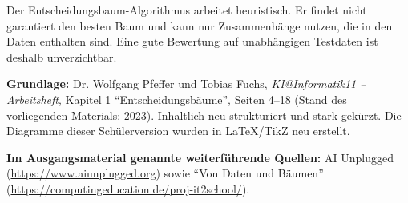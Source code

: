 \documentclass[11pt,a4paper,twoside]{article}
\begin{document}
\begin{merke}[title=Grenzen des Verfahrens]
Der Entscheidungsbaum-Algorithmus arbeitet heuristisch. Er findet nicht garantiert den besten Baum und kann
nur Zusammenhänge nutzen, die in den Daten enthalten sind. Eine gute Bewertung auf unabhängigen Testdaten
ist deshalb unverzichtbar.
\end{merke}

\vfill
{\footnotesize\color{midgray}
\textbf{Grundlage:} Dr. Wolfgang Pfeffer und Tobias Fuchs, \emph{KI@Informatik11 -- Arbeitsheft},
Kapitel 1 ``Entscheidungsbäume'', Seiten 4--18 (Stand des vorliegenden Materials: 2023). Inhaltlich neu
strukturiert und stark gekürzt. Die Diagramme dieser Schülerversion wurden in LaTeX/TikZ neu erstellt.\par
\textbf{Im Ausgangsmaterial genannte weiterführende Quellen:} AI Unplugged
(\url{https://www.aiunplugged.org}) sowie ``Von Daten und Bäumen''
(\url{https://computingeducation.de/proj-it2school/}).}
\end{document}
